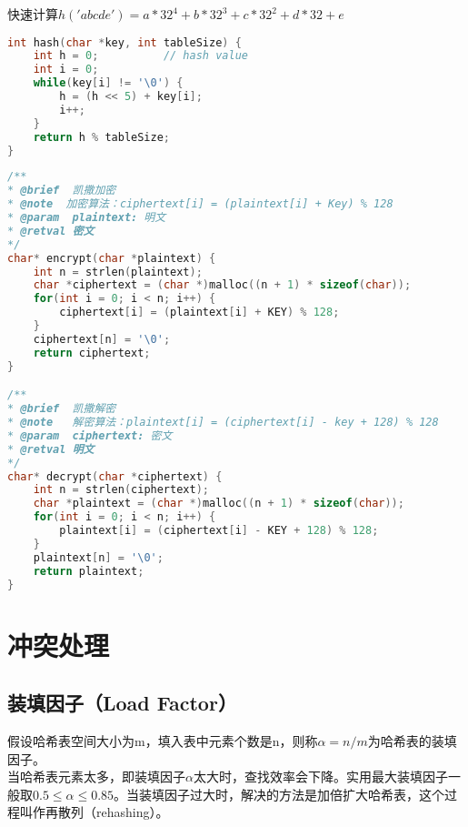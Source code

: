 快速计算$ h('abcde') = a * 32^4 + b * 32^3 + c * 32^2 + d * 32 + e $

\begin{lstlisting}[language=C]
int hash(char *key, int tableSize) {
    int h = 0;          // hash value
    int i = 0;
    while(key[i] != '\0') {
        h = (h << 5) + key[i];
        i++;
    }
    return h % tableSize;
}
\end{lstlisting}

\vspace{0.5cm}


\begin{lstlisting}[language=C]
/**
* @brief  凯撒加密
* @note  加密算法：ciphertext[i] = (plaintext[i] + Key) % 128
* @param  plaintext: 明文
* @retval 密文
*/
char* encrypt(char *plaintext) {
    int n = strlen(plaintext);
    char *ciphertext = (char *)malloc((n + 1) * sizeof(char));
    for(int i = 0; i < n; i++) {
        ciphertext[i] = (plaintext[i] + KEY) % 128;
    }
    ciphertext[n] = '\0';
    return ciphertext;
}

/**
* @brief  凯撒解密
* @note   解密算法：plaintext[i] = (ciphertext[i] - key + 128) % 128
* @param  ciphertext: 密文
* @retval 明文
*/
char* decrypt(char *ciphertext) {
    int n = strlen(ciphertext);
    char *plaintext = (char *)malloc((n + 1) * sizeof(char));
    for(int i = 0; i < n; i++) {
        plaintext[i] = (ciphertext[i] - KEY + 128) % 128;
    }
    plaintext[n] = '\0';
    return plaintext;
}
\end{lstlisting}

\newpage

\section{冲突处理}

\subsection{装填因子（Load Factor）}

假设哈希表空间大小为m，填入表中元素个数是n，则称$ \alpha = n / m $为哈希表的装填因子。 \\

当哈希表元素太多，即装填因子$ \alpha $太大时，查找效率会下降。实用最大装填因子一般取$ 0.5 \le \alpha \le 0.85 $。当装填因子过大时，解决的方法是加倍扩大哈希表，这个过程叫作再散列（rehashing）。 \\

